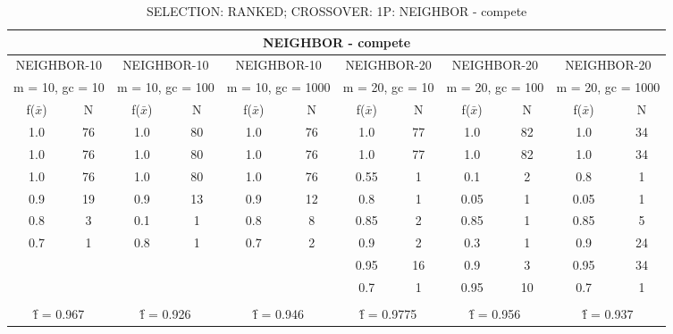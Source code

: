 \begin{table}[H]
	\centering
	\caption{SELECTION: RANKED; CROSSOVER: 1P: NEIGHBOR - compete}
	\begin{adjustbox}{width=1\textwidth}
		\begin{tabular}{ |c|c||c|c||c|c||c|c||c|c||c|c| }
			\hline
			\multicolumn{12}{|c|}{NEIGHBOR - compete} \\
			\hline
			\multicolumn{2}{|c||}{NEIGHBOR-10} & \multicolumn{2}{c||}{NEIGHBOR-10} & \multicolumn{2}{c||}{NEIGHBOR-10} & \multicolumn{2}{c||}{NEIGHBOR-20} & \multicolumn{2}{c||}{NEIGHBOR-20} & \multicolumn{2}{c|}{NEIGHBOR-20}\\
			\hline
			\multicolumn{2}{|c||}{m = 10, gc = 10} & \multicolumn{2}{c||}{m = 10, gc = 100} & \multicolumn{2}{c||}{m = 10, gc = 1000} & \multicolumn{2}{c||}{m = 20, gc = 10} & \multicolumn{2}{c||}{m = 20, gc = 100} & \multicolumn{2}{c|}{m = 20, gc = 1000}\\
			\hline
			f($\bar{x}$) & N & f($\bar{x}$) & N & f($\bar{x}$) & N & f($\bar{x}$) & N & f($\bar{x}$) & N & f($\bar{x}$) & N\\
			\hline
			\hline
			1.0 & 76 & 1.0 & 80 & 1.0 & 76 & 1.0 & 77 & 1.0 & 82 & 1.0 & 34\\
			\hline
			1.0 & 76 & 1.0 & 80 & 1.0 & 76 & 1.0 & 77 & 1.0 & 82 & 1.0 & 34\\
			1.0 & 76 & 1.0 & 80 & 1.0 & 76 & 0.55 & 1 & 0.1 & 2 & 0.8 & 1\\
			0.9 & 19 & 0.9 & 13 & 0.9 & 12 & 0.8 & 1 & 0.05 & 1 & 0.05 & 1\\
			0.8 & 3 & 0.1 & 1 & 0.8 & 8 & 0.85 & 2 & 0.85 & 1 & 0.85 & 5\\
			0.7 & 1 & 0.8 & 1 & 0.7 & 2 & 0.9 & 2 & 0.3 & 1 & 0.9 & 24\\
			&   &   &   &   &   & 0.95 & 16 & 0.9 & 3 & 0.95 & 34\\
			&   &   &   &   &   & 0.7 & 1 & 0.95 & 10 & 0.7 & 1\\
			&   &   &   &   &   &   &   &   &   &   &  \\
			\hline
			\multicolumn{2}{|c||}{\^{f} = 0.967} & \multicolumn{2}{c||}{\^{f} = 0.926} & \multicolumn{2}{c||}{\^{f} = 0.946} & \multicolumn{2}{c||}{\^{f} = 0.9775} & \multicolumn{2}{c||}{\^{f} = 0.956} & \multicolumn{2}{c|}{\^{f} = 0.937}\\
			\hline
		\end{tabular}
	\end{adjustbox}
\end{table}